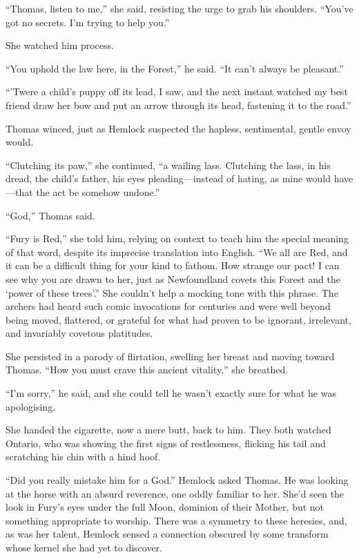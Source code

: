 \documentclass[11pt,a5paper]{article}
\begin{document}
``Thomas, listen to me,'' she said, resisting the urge to grab his shoulders. ``You've got no secrets. I'm trying to help you.''

She watched him process.

``You uphold the law here, in the Forest,'' he said. ``It can't always be pleasant.''

``'Twere a child's puppy off its lead, I saw, and the next instant watched my best friend draw her bow and put an arrow through its head, fastening it to the road.''

Thomas winced, just as Hemlock suspected the hapless, sentimental, gentle envoy would.

``Clutching its paw,'' she continued, ``a wailing lass. Clutching the lass, in his dread, the child's father, his eyes pleading---instead of hating, as mine would have---that the act be somehow undone.''

``God,'' Thomas said.

``Fury is Red,'' she told him, relying on context to teach him the special meaning of that word, despite its imprecise translation into English. ``We all are Red, and it can be a difficult thing for your kind to fathom. How strange our pact! I can see why you are drawn to her, just as Newfoundland covets this Forest and the `power of these trees'.'' She couldn't help a mocking tone with this phrase. The archers had heard such comic invocations for centuries and were well beyond being moved, flattered, or grateful for what had proven to be ignorant, irrelevant, and invariably covetous platitudes.

She persisted in a parody of flirtation, swelling her breast and moving toward Thomas. ``How you must crave this ancient vitality,'' she breathed.

``I'm sorry,'' he said, and she could tell he wasn't exactly sure for what he was apologising.

She handed the cigarette, now a mere butt, back to him. They both watched Ontario, who was showing the first signs of restlessness, flicking his tail and scratching his chin with a hind hoof.

``Did you really mistake him for a God.'' Hemlock asked Thomas. He was looking at the horse with an absurd reverence, one oddly familiar to her. She'd seen the look in Fury's eyes under the full Moon, dominion of their Mother, but not something appropriate to worship. There was a symmetry to these heresies, and, as was her talent, Hemlock sensed a connection obscured by some transform whose kernel she had yet to discover.
\end{document}
